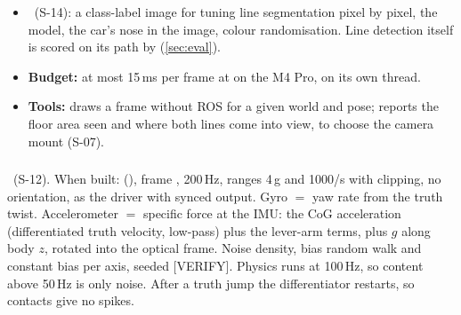 \documentclass[11pt,a4paper]{article}
\newcommand{\deferred}{\target{Deferred}}
\begin{document}
\begin{itemize}
  \item \deferred\ (S-14): a class-label image for tuning line segmentation pixel by pixel, the  model, the car's nose in the image, colour randomisation. Line detection itself is scored on its path by  (\cref{sec:eval}).
  \item \textbf{Budget:} at most 15\,ms per frame at  on the M4 Pro, on its own thread.
  \item \textbf{Tools:}  draws a frame without ROS for a given world and pose;  reports the floor area seen and where both lines come into view, to choose the camera mount (S-07).
\end{itemize}

\subsubsection{}\label{sec:imu}
\deferred\ (S-12). When built:  (), frame , 200\,Hz, ranges 4\,g and 1000\textdegree/s with clipping, no orientation, as the driver with synced output. Gyro $=$ yaw rate from the truth twist. Accelerometer $=$ specific force at the IMU: the CoG acceleration (differentiated truth velocity, low-pass) plus the lever-arm terms, plus $g$ along body $z$, rotated into the optical frame. Noise density, bias random walk and constant bias per axis, seeded [VERIFY]. Physics runs at 100\,Hz, so content above 50\,Hz is only noise. After a truth jump the differentiator restarts, so contacts give no spikes.
\end{document}
